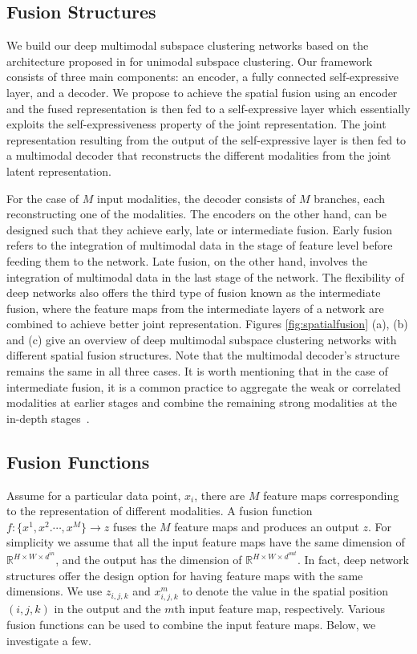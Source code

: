 \documentclass[journal]{IEEEtran}
\def\R{\mathbb R}
\begin{document}
\subsection{Fusion Structures}
We build our deep multimodal subspace clustering networks based on the architecture proposed in \cite{deepsc17nips} for unimodal subspace clustering.  Our framework consists of three main components: an encoder, a fully connected self-expressive layer, and a decoder.		   We propose to achieve the spatial fusion using an encoder and the fused representation is then fed to a self-expressive layer which essentially exploits the self-expressiveness property of the joint representation.		  The joint representation resulting from the output of the self-expressive layer is then fed to a multimodal decoder that reconstructs the different modalities from the joint latent representation.		

For the case of $M$ input modalities, the decoder consists of $M$ branches, each reconstructing one of the modalities.  The encoders on the other hand, can be designed such that they achieve  early, late or intermediate fusion.  Early fusion refers to the integration of multimodal data in the stage of feature level before feeding them to the network.		  Late fusion, on the other hand, involves the integration of multimodal data in the last stage of the network. The flexibility of deep networks also offers the third type of fusion known as the intermediate fusion, where the feature maps from the intermediate layers of a network are combined to achieve better joint representation. 	Figures \ref{fig:spatialfusion} (a), (b) and (c) give an overview of deep multimodal subspace clustering networks with different spatial fusion structures.		 Note that the multimodal decoder's structure remains the same in all three cases.  It is worth mentioning that in the case of intermediate fusion, it is a common practice to aggregate the weak or correlated modalities at earlier stages and combine the remaining strong modalities at the in-depth stages~\cite{ramachandram2017deep}.		



\subsection{Fusion Functions}
Assume for a particular data point, $x_i$, there are $M$ feature maps corresponding to the representation of different modalities.		A fusion function $f : \{x^1,x^2.		\cdots, x^M\} \rightarrow z$ fuses the $M$ feature maps and produces an output $z$.		   For simplicity we assume that all the input feature maps have the same dimension of $\R^{H \times W \times d^{in}}$, and the output has the dimension of 
$\R^{H \times W \times d^{out}}$.		  In fact, deep network structures offer the design option for having feature maps with the same dimensions.		 We use  $z_{i,j,k}$ and $x^{m}_{i,j,k}$  to denote the value in the spatial position $(i,j,k)$ in the output and the $m$th input feature map, respectively.  Various fusion functions can be used to combine the input feature maps.  Below, we investigate a few.  
\end{document}
